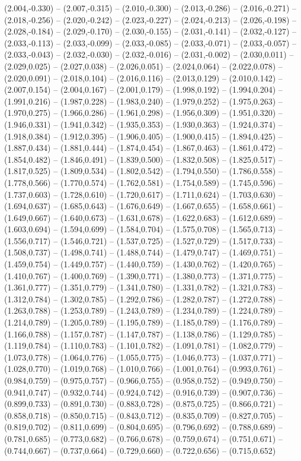 (2.004,-0.330) -- (2.007,-0.315) -- (2.010,-0.300) -- (2.013,-0.286) -- (2.016,-0.271) -- (2.018,-0.256) -- (2.020,-0.242) -- (2.023,-0.227) -- (2.024,-0.213) -- (2.026,-0.198) -- (2.028,-0.184) -- (2.029,-0.170) -- (2.030,-0.155) -- (2.031,-0.141) -- (2.032,-0.127) -- (2.033,-0.113) -- (2.033,-0.099) -- (2.033,-0.085) -- (2.033,-0.071) -- (2.033,-0.057) -- (2.033,-0.043) -- (2.032,-0.030) -- (2.032,-0.016) -- (2.031,-0.002) -- (2.030,0.011) -- (2.029,0.025) -- (2.027,0.038) -- (2.026,0.051) -- (2.024,0.064) -- (2.022,0.078) -- (2.020,0.091) -- (2.018,0.104) -- (2.016,0.116) -- (2.013,0.129) -- (2.010,0.142) -- (2.007,0.154) -- (2.004,0.167) -- (2.001,0.179) -- (1.998,0.192) -- (1.994,0.204) -- (1.991,0.216) -- (1.987,0.228) -- (1.983,0.240) -- (1.979,0.252) -- (1.975,0.263) -- (1.970,0.275) -- (1.966,0.286) -- (1.961,0.298) -- (1.956,0.309) -- (1.951,0.320) -- (1.946,0.331) -- (1.941,0.342) -- (1.935,0.353) -- (1.930,0.363) -- (1.924,0.374) -- (1.918,0.384) -- (1.912,0.395) -- (1.906,0.405) -- (1.900,0.415) -- (1.894,0.425) -- (1.887,0.434) -- (1.881,0.444) -- (1.874,0.454) -- (1.867,0.463) -- (1.861,0.472) -- (1.854,0.482) -- (1.846,0.491) -- (1.839,0.500) -- (1.832,0.508) -- (1.825,0.517) -- (1.817,0.525) -- (1.809,0.534) -- (1.802,0.542) -- (1.794,0.550) -- (1.786,0.558) -- (1.778,0.566) -- (1.770,0.574) -- (1.762,0.581) -- (1.754,0.589) -- (1.745,0.596) -- (1.737,0.603) -- (1.728,0.610) -- (1.720,0.617) -- (1.711,0.624) -- (1.703,0.630) -- (1.694,0.637) -- (1.685,0.643) -- (1.676,0.649) -- (1.667,0.655) -- (1.658,0.661) -- (1.649,0.667) -- (1.640,0.673) -- (1.631,0.678) -- (1.622,0.683) -- (1.612,0.689) -- (1.603,0.694) -- (1.594,0.699) -- (1.584,0.704) -- (1.575,0.708) -- (1.565,0.713) -- (1.556,0.717) -- (1.546,0.721) -- (1.537,0.725) -- (1.527,0.729) -- (1.517,0.733) -- (1.508,0.737) -- (1.498,0.741) -- (1.488,0.744) -- (1.479,0.747) -- (1.469,0.751) -- (1.459,0.754) -- (1.449,0.757) -- (1.440,0.759) -- (1.430,0.762) -- (1.420,0.765) -- (1.410,0.767) -- (1.400,0.769) -- (1.390,0.771) -- (1.380,0.773) -- (1.371,0.775) -- (1.361,0.777) -- (1.351,0.779) -- (1.341,0.780) -- (1.331,0.782) -- (1.321,0.783) -- (1.312,0.784) -- (1.302,0.785) -- (1.292,0.786) -- (1.282,0.787) -- (1.272,0.788) -- (1.263,0.788) -- (1.253,0.789) -- (1.243,0.789) -- (1.234,0.789) -- (1.224,0.789) -- (1.214,0.789) -- (1.205,0.789) -- (1.195,0.789) -- (1.185,0.789) -- (1.176,0.789) -- (1.166,0.788) -- (1.157,0.787) -- (1.147,0.787) -- (1.138,0.786) -- (1.129,0.785) -- (1.119,0.784) -- (1.110,0.783) -- (1.101,0.782) -- (1.091,0.781) -- (1.082,0.779) -- (1.073,0.778) -- (1.064,0.776) -- (1.055,0.775) -- (1.046,0.773) -- (1.037,0.771) -- (1.028,0.770) -- (1.019,0.768) -- (1.010,0.766) -- (1.001,0.764) -- (0.993,0.761) -- (0.984,0.759) -- (0.975,0.757) -- (0.966,0.755) -- (0.958,0.752) -- (0.949,0.750) -- (0.941,0.747) -- (0.932,0.744) -- (0.924,0.742) -- (0.916,0.739) -- (0.907,0.736) -- (0.899,0.733) -- (0.891,0.730) -- (0.883,0.728) -- (0.875,0.725) -- (0.866,0.721) -- (0.858,0.718) -- (0.850,0.715) -- (0.843,0.712) -- (0.835,0.709) -- (0.827,0.705) -- (0.819,0.702) -- (0.811,0.699) -- (0.804,0.695) -- (0.796,0.692) -- (0.788,0.689) -- (0.781,0.685) -- (0.773,0.682) -- (0.766,0.678) -- (0.759,0.674) -- (0.751,0.671) -- (0.744,0.667) -- (0.737,0.664) -- (0.729,0.660) -- (0.722,0.656) -- (0.715,0.652) 